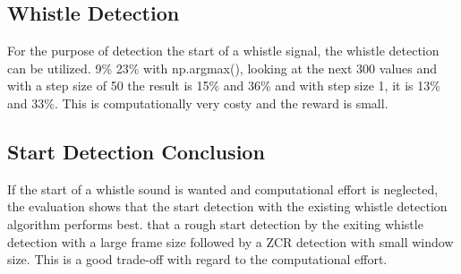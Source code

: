 
\subsection{Whistle Detection}
\label{subsec:04_wd}

For the purpose of detection the start of a whistle signal, the whistle
detection can be utilized.
9\si{\percent} 23\si{\percent} with np.argmax(), looking at the next 300
values and with a step size of 50 the result is 15\si{\percent} and 36\si{\percent}
and with step size 1, it is 13\si{\percent} and 33\si{\percent}.
This is computationally very costy and the reward is small.

\subsection{Start Detection Conclusion}
\label{subsec:04_startDetectionConclusion}

If the start of a whistle sound is wanted and computational effort is
neglected, the evaluation shows that the start detection with the
existing whistle detection algorithm performs best.
that a rough start detection by the exiting whistle detection
with a large frame size followed by a \ac{ZCR} detection with small
window size.
This is a good trade-off with regard to the computational effort.

